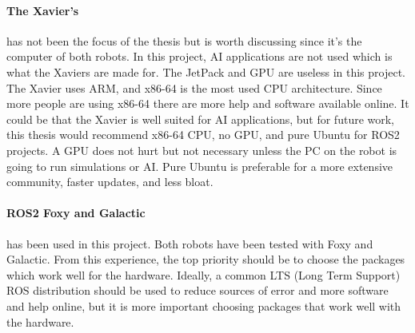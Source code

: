 \paragraph{The Xavier's} has not been the focus of the thesis but is worth discussing since it's the computer of both robots. In this project, AI applications are not used which is what the Xaviers are made for. The JetPack and GPU are useless in this project. The Xavier uses ARM, and x86-64 is the most used CPU architecture. Since more people are using x86-64 there are more help and software available online. 
It could be that the Xavier is well suited for AI applications, but for future work, this thesis would recommend x86-64 CPU, no GPU, and pure Ubuntu for ROS2 projects. A GPU does not hurt but not necessary unless the PC on the robot is going to run simulations or AI. Pure Ubuntu is preferable for a more extensive community, faster updates, and less bloat. 

\paragraph{ROS2 Foxy and Galactic} has been used in this project. Both robots have been tested with Foxy and Galactic. From this experience, the top priority should be to choose the packages which work well for the hardware. Ideally, a common LTS (Long Term Support) ROS distribution should be used to reduce sources of error and more software and help online, but it is more important choosing packages that work well with the hardware. 

